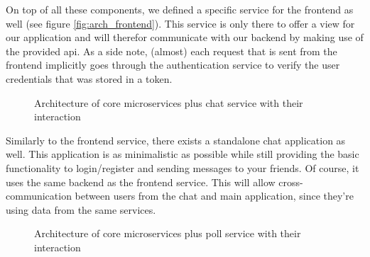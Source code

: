 \documentclass{article}
\begin{document}
On top of all these components, we defined a specific service for the frontend as well (see figure \ref{fig:arch_frontend}). This service is only there to offer a view for our application and will therefor communicate with our backend by making use of the provided api. As a side note, (almost) each request that is sent from the frontend implicitly goes through the authentication service to verify the user credentials that was stored in a token.

\begin{figure}[H]
    \begin{center}
    \end{center}
    \caption{Architecture of core microservices plus chat service with their interaction}
    \label{fig:arch_chat}
\end{figure}

Similarly to the frontend service, there exists a standalone chat application as well. This application is as minimalistic as possible while still providing the basic functionality to login/register and sending messages to your friends. Of course, it uses the same backend as the frontend service. This will allow cross-communication between users from the chat and main application, since they're using data from the same services.

\begin{figure}[H]
    \begin{center}
    \end{center}
    \caption{Architecture of core microservices plus poll service with their interaction}
    \label{fig:arch_poll}
\end{figure}
\end{document}
